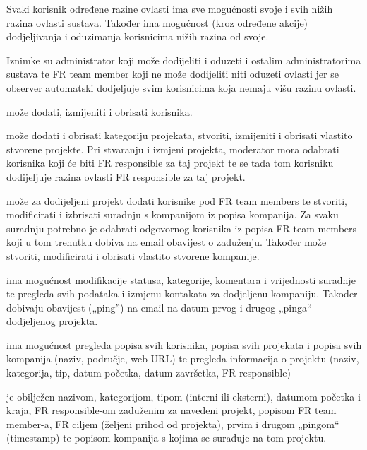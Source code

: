 		{Svaki korisnik određene razine ovlasti ima sve mogućnosti svoje i svih nižih razina ovlasti sustava. Također ima mogućnost (kroz određene akcije) dodjeljivanja i oduzimanja  korisnicima nižih razina od svoje.}

		{Iznimke su administrator koji može dodijeliti i oduzeti i ostalim administratorima sustava te FR team member koji ne može dodijeliti niti oduzeti ovlasti jer se observer automatski dodjeljuje svim korisnicima koja nemaju višu razinu ovlasti.}\vspace{0.3cm}
		
		
		{ može dodati, izmijeniti i obrisati korisnika.}\vspace{0.1cm}

		{ može dodati i obrisati kategoriju projekata, stvoriti, izmijeniti i obrisati vlastito stvorene projekte. Pri stvaranju i izmjeni projekta, moderator mora odabrati korisnika koji će biti FR responsible za taj projekt te se tada tom korisniku dodijeljuje razina ovlasti FR responsible za taj projekt.}\vspace{0.1cm}

		{ može za dodijeljeni projekt dodati korisnike pod FR team members te stvoriti, modificirati i izbrisati suradnju s kompanijom iz popisa kompanija. Za svaku suradnju potrebno je odabrati odgovornog korisnika iz popisa FR team members koji u tom trenutku dobiva na email obavijest o zaduženju. Također može stvoriti, modificirati i obrisati vlastito stvorene kompanije.}\vspace{0.1cm}

		{ ima mogućnost modifikacije statusa, kategorije, komentara i vrijednosti suradnje te pregleda svih podataka i izmjenu kontakata za dodjeljenu kompaniju. Također dobivaju obavijest („ping”) na email na datum prvog i drugog „pinga“ dodjeljenog projekta.}\vspace{0.1cm}

		{ ima mogućnost pregleda popisa svih korisnika, popisa svih projekata i popisa svih kompanija (naziv, područje, web URL) te pregleda informacija o projektu (naziv, kategorija, tip, datum početka, datum završetka, FR responsible)}\vspace{0.3cm}
		

		{ je obilježen nazivom, kategorijom, tipom (interni ili eksterni), datumom početka i kraja, FR responsible-om zaduženim za navedeni projekt, popisom FR team member-a, FR ciljem (željeni prihod od projekta), prvim i drugom „pingom“ (timestamp) te popisom kompanija s kojima se surađuje na tom projektu.}\vspace{0.1cm}

